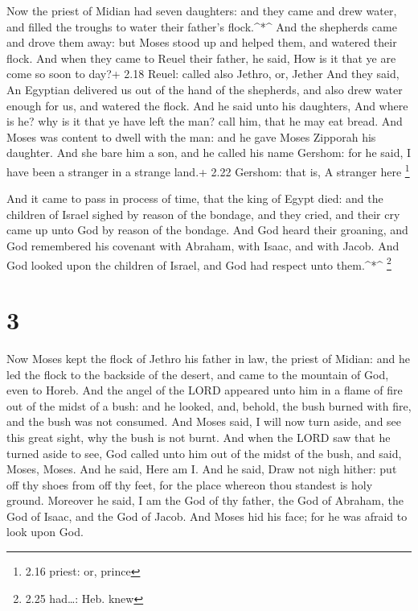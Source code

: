  Now the priest of Midian had seven daughters: and they
came and drew water, and filled the troughs to water their father's
flock.\^{}*\^{}  And the shepherds came and drove them
away: but Moses stood up and helped them, and watered their flock.
 And when they came to Reuel their father, he said, How is
it that ye are come so soon to day?+ 2.18 Reuel: called also Jethro, or,
Jether  And they said, An Egyptian delivered us out of the
hand of the shepherds, and also drew water enough for us, and watered
the flock.  And he said unto his daughters, And where is
he? why is it that ye have left the man? call him, that he may eat
bread.  And Moses was content to dwell with the man: and he
gave Moses Zipporah his daughter.  And she bare him a son,
and he called his name Gershom: for he said, I have been a stranger in a
strange land.+ 2.22 Gershom: that is, A stranger here \footnote{2.16
  priest: or, prince}

 And it came to pass in process of time, that the king of
Egypt died: and the children of Israel sighed by reason of the bondage,
and they cried, and their cry came up unto God by reason of the bondage.
 And God heard their groaning, and God remembered his
covenant with Abraham, with Isaac, and with Jacob.  And God
looked upon the children of Israel, and God had respect unto
them.\^{}*\^{} \footnote{2.25 had\ldots: Heb. knew}

\hypertarget{section-2}{%
\section{3}\label{section-2}}

 Now Moses kept the flock of Jethro his father in law, the
priest of Midian: and he led the flock to the backside of the desert,
and came to the mountain of God, even to Horeb.  And the
angel of the LORD appeared unto him in a flame of fire out of the midst
of a bush: and he looked, and, behold, the bush burned with fire, and
the bush was not consumed.  And Moses said, I will now turn
aside, and see this great sight, why the bush is not burnt. 
And when the LORD saw that he turned aside to see, God called unto him
out of the midst of the bush, and said, Moses, Moses. And he said, Here
am I.  And he said, Draw not nigh hither: put off thy shoes
from off thy feet, for the place whereon thou standest is holy ground.
 Moreover he said, I am the God of thy father, the God of
Abraham, the God of Isaac, and the God of Jacob. And Moses hid his face;
for he was afraid to look upon God.

